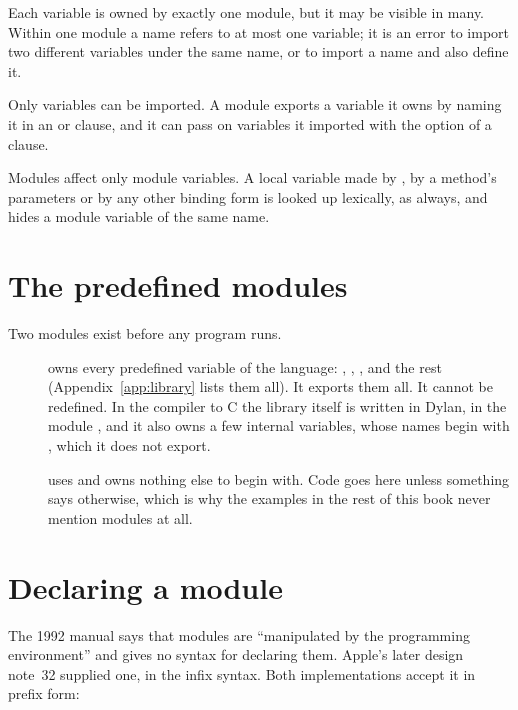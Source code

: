 Each variable is owned by exactly one module, but it may be visible in
many. Within one module a name refers to at most one variable; it is an
error to import two different variables under the same name, or to import
a name and also define it.

Only  variables can be imported. A module exports a
variable it owns by naming it in an  or  clause,
and it can pass on variables it imported with the  option
of a  clause.

Modules affect only module variables. A local variable made by
, by a method's parameters or by any other binding form is
looked up lexically, as always, and hides a module variable of the same
name.

\section{The predefined modules}\label{sec:modules-predefined}

Two modules exist before any program runs.

\begin{description}
\item[] owns every predefined variable of the language:
  \code{+}, , ,  and the rest
  (Appendix~\ref{app:library} lists them all). It exports them all. It
  cannot be redefined. In the compiler to C the library itself is
  written in Dylan, in the module , and it also owns a few
  internal variables, whose names begin with \code{\%}, which it does not
  export.
\item[] uses  and owns nothing else to begin
  with. Code goes here unless something says otherwise, which is why the
  examples in the rest of this book never mention modules at all.
\end{description}

\section{Declaring a module}\label{sec:modules-define}

The 1992 manual says that modules are ``manipulated by the programming
environment'' and gives no syntax for declaring them. Apple's later
design note~32 supplied one, in the infix syntax. Both implementations
accept it in prefix form:

